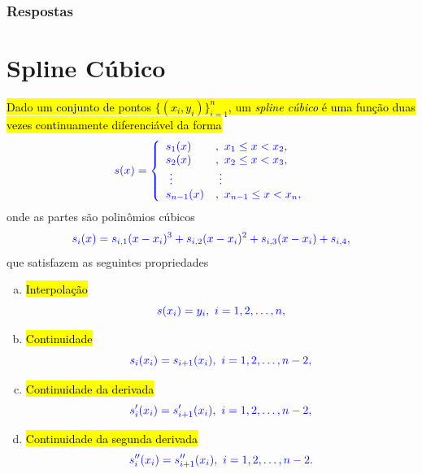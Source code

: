 \subsubsection{Respostas}
\shipoutAnswer
\fi


\section{Spline Cúbico}\label{cap_interp_sec_splines}

\hl{Dado um conjunto de pontos $\{(x_i,y_i)\}_{i=1}^n$, um \emph{spline cúbico} é uma função duas vezes continuamente diferenciável da forma}
\begin{equation}\color{blue}s(x) = \left\{\begin{array}{ll}
    s_1(x) &, ~x_1 \leq x < x_2, \\
    s_2(x) &, ~x_2 \leq x < x_3, \\
    \text{}~\vdots & \text{}~\vdots \\
    s_{n-1}(x) &, ~x_{n-1}\leq x < x_n,
  \end{array}\right.
\end{equation}
onde as partes são polinômios cúbicos
\begin{equation}\color{blue}s_i(x) = s_{i,1}(x-x_{i})^3 + s_{i,2}(x-x_{i})^2 + s_{i,3}(x-x_{i}) + s_{i,4},
\end{equation}
que satisfazem as seguintes propriedades
\begin{enumerate}[a)]
\item \hl{Interpolação}
  \begin{equation}
    \color{blue}s(x_i) = y_i, ~i=1, 2, \dotsc, n,
  \end{equation}
\item \hl{Continuidade}
  \begin{equation}
    \color{blue}s_i(x_i) = s_{i+1}(x_i), ~i = 1, 2, \dotsc, n-2,
  \end{equation}
\item \hl{Continuidade da derivada}
  \begin{equation}
    \color{blue}s_i'(x_i) = s_{i+1}'(x_i), ~i = 1, 2, \dotsc, n-2,  
  \end{equation}
\item \hl{Continuidade da segunda derivada}
  \begin{equation}
    \color{blue}s_i''(x_i) = s_{i+1}''(x_i), ~i= 1, 2, \dotsc, n-2.
  \end{equation}
\end{enumerate}

